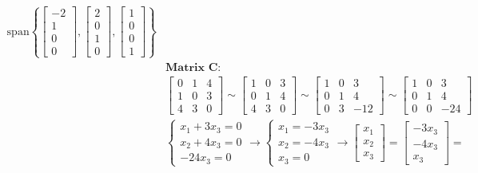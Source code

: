 \documentclass{article}
\begin{document}
\begin{align*}
\text{span}\left\{\begin{bmatrix} -2 \\ 1 \\ 0 \\ 0 \end{bmatrix}, \begin{bmatrix} 2 \\ 0 \\ 1 \\ 0 \end{bmatrix}, \begin{bmatrix} 1 \\ 0 \\ 0 \\ 1 \end{bmatrix}\right\}
\\
&\textbf{Matrix C:}
\\
&\begin{bmatrix} 0 & 1 & 4 \\ 1 & 0 & 3 \\ 4 & 3 & 0 \end{bmatrix} \sim
\begin{bmatrix} 1 & 0 & 3 \\ 0 & 1 & 4 \\ 4 & 3 & 0 \end{bmatrix} \sim
\begin{bmatrix} 1 & 0 & 3 \\ 0 & 1 & 4 \\ 0 & 3 & -12 \end{bmatrix} \sim
\begin{bmatrix} 1 & 0 & 3 \\ 0 & 1 & 4 \\ 0 & 0 & -24 \end{bmatrix}
\\
&\begin{cases} x_{1} + 3x_{3} = 0 \\ x_{2} + 4x_{3} = 0 \\ -24x_{3} = 0 \end{cases} \rightarrow
\begin{cases} x_{1} = -3x_{3} \\ x_{2} = -4x_{3} \\ x_{3} = 0 \end{cases} \rightarrow
\begin{bmatrix} x_{1} \\ x_{2} \\ x_{3} \end{bmatrix} =
\begin{bmatrix} -3x_{3} \\ -4x_{3} \\ x_{3} \end{bmatrix} =

\end{align*}
\end{document}
